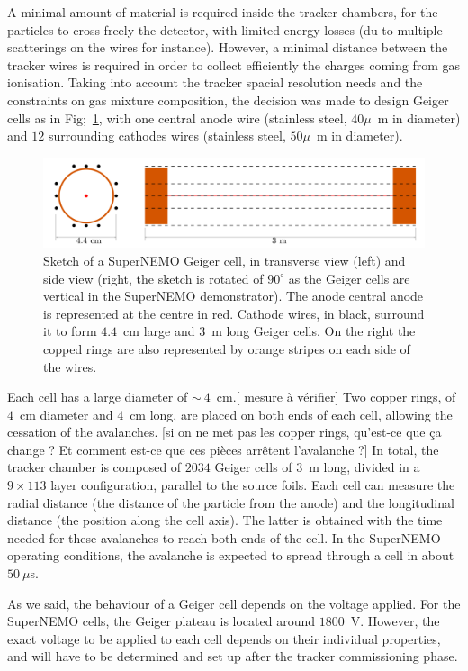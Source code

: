 A minimal amount of material is required inside the tracker chambers, for the particles to cross freely the detector, with limited energy losses (du to multiple scatterings on the wires for instance).
However, a minimal distance between the tracker wires is required in order to collect efficiently the charges coming from gas ionisation.
Taking into account the tracker spacial resolution needs and the constraints on gas mixture composition, the decision was made to design Geiger cells as in Fig;~\ref{fig:SN_geiger_cell}, with one central anode wire (stainless steel, $40\mu$~m in diameter) and $12$ surrounding cathodes wires (stainless steel, $50\mu$~m in diameter).
\begin{figure}[h!]
\centering
\includegraphics[width=1\textwidth]{SNdemonstrator/fig_SNdemonstrator/geiger_cell.pdf}
\caption{Sketch of a SuperNEMO Geiger cell, in transverse view (left) and side view (right, the sketch is rotated of $90^{\circ}$ as the Geiger cells are vertical in the SuperNEMO demonstrator).
  The anode central anode is represented at the centre in red.
  Cathode wires, in black, surround it to form $4.4$~cm large and $3$~m long Geiger cells.
  On the right the copped rings are also represented by orange stripes on each side of the wires.
\label{fig:SN_geiger_cell}}
\end{figure}
Each cell has a large diameter of $\sim~4$~cm.[ mesure à vérifier]
Two copper rings, of $4$~cm diameter and $4$~cm long, are placed on both ends of each cell, allowing the cessation of the avalanches. [si on ne met pas les copper rings, qu'est-ce que ça change ? Et comment est-ce que ces pièces arrêtent l'avalanche ?]
In total, the tracker chamber is composed of $2034$ Geiger cells of $3$~m long, divided in a $9\times113$ layer configuration, parallel to the source foils.
Each cell can measure the radial distance (the distance of the particle from the anode) and the longitudinal distance (the position along the cell axis).
The latter is obtained with the time needed for these avalanches to reach both ends of the cell.
In the SuperNEMO operating conditions, the avalanche is expected to spread through a cell in about $50~\mu$s.

As we said, the behaviour of a Geiger cell depends on the voltage applied.
For the SuperNEMO cells, the Geiger plateau is located around $1800$~V.
However, the exact voltage to be applied to each cell depends on their individual properties, and will have to be determined and set up after the tracker commissioning phase.


